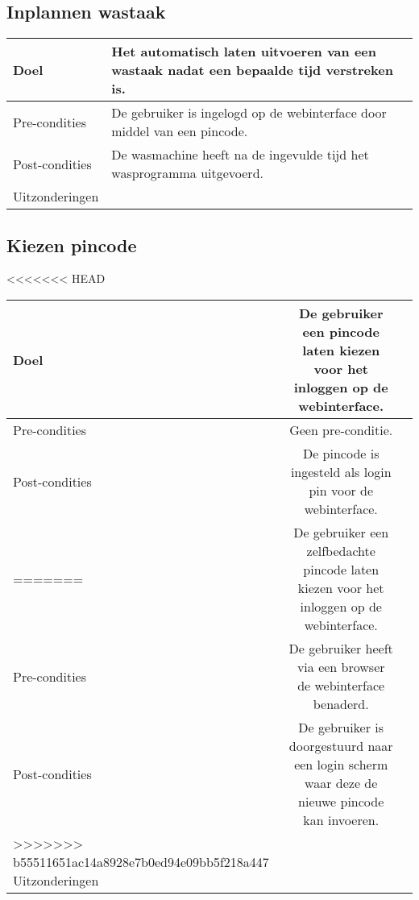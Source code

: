 \subsection{Inplannen wastaak}
\begin{center}
  \begin{tabular}{ | p{4cm} | p{8.5cm} | }    \hline
    Doel & Het automatisch laten uitvoeren van een wastaak nadat een bepaalde tijd verstreken is. \\ \hline
    Pre-condities & De gebruiker is ingelogd op de webinterface door middel van een pincode. \\ \hline
    Post-condities & De wasmachine heeft na de ingevulde tijd het wasprogramma uitgevoerd. \\ \hline
    Uitzonderingen &  \\
    \hline
  \end{tabular}
\end{center}

\subsection{Kiezen pincode}
\begin{center}
<<<<<<< HEAD
  \begin{tabular}{ l | c | r | }
    \hline
    Doel & De gebruiker een pincode laten kiezen voor het inloggen op de webinterface. \\ \hline
    Pre-condities & Geen pre-conditie. \\ \hline
    Post-condities & De pincode is ingesteld als login pin voor de webinterface. \\ \hline
=======
  \begin{tabular}{ | p{4cm} | p{8.5cm} | }    \hline
    Doel & De gebruiker een zelfbedachte pincode laten kiezen voor het inloggen op de webinterface. \\ \hline
    Pre-condities & De gebruiker heeft via een browser de webinterface benaderd. \\ \hline
    Post-condities & De gebruiker is doorgestuurd naar een login scherm waar deze de nieuwe pincode kan invoeren. \\ \hline
>>>>>>> b55511651ac14a8928e7b0ed94e09bb5f218a447
    Uitzonderingen &  \\
    \hline
  \end{tabular}
\end{center}

